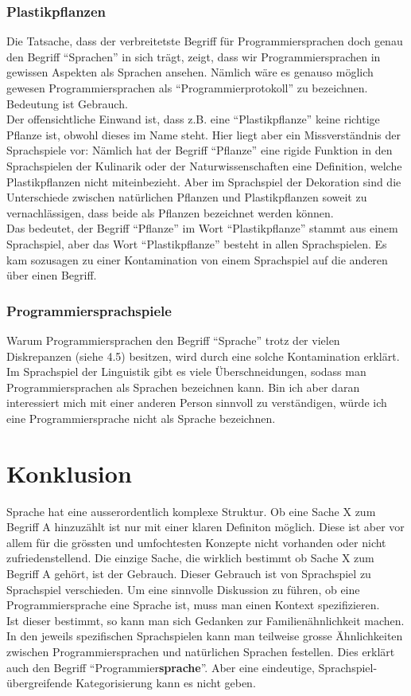 \documentclass[10pt,a4paper]{article}
\begin{document}
\subsubsection{Plastikpflanzen}
Die Tatsache, dass der verbreitetste Begriff für Programmiersprachen doch genau den Begriff \enquote{Sprachen} in sich trägt, zeigt, dass wir Programmiersprachen in gewissen Aspekten als Sprachen ansehen. Nämlich wäre es genauso möglich gewesen Programmiersprachen als \enquote{Programmierprotokoll} zu bezeichnen. Bedeutung ist Gebrauch. \\
Der offensichtliche Einwand ist, dass z.B. eine \enquote{Plastikpflanze} keine richtige Pflanze ist, obwohl dieses im Name steht. Hier liegt aber ein Missverständnis der Sprachspiele vor: Nämlich hat der Begriff \enquote{Pflanze} eine rigide Funktion in den Sprachspielen der Kulinarik oder der Naturwissenschaften eine Definition, welche Plastikpflanzen nicht miteinbezieht. Aber im Sprachspiel der Dekoration sind die Unterschiede zwischen natürlichen Pflanzen und Plastikpflanzen soweit zu vernachlässigen, dass beide als Pflanzen bezeichnet werden können. \\
Das bedeutet, der Begriff \enquote{Pflanze} im Wort \enquote{Plastikpflanze} stammt aus einem Sprachspiel, aber das Wort \enquote{Plastikpflanze} besteht in allen Sprachspielen. Es kam sozusagen zu einer Kontamination von einem Sprachspiel auf die anderen über einen Begriff.

\subsubsection{Programmiersprachspiele}
Warum Programmiersprachen den Begriff \enquote{Sprache} trotz der vielen Diskrepanzen (siehe 4.5) besitzen, wird durch eine solche Kontamination erklärt. Im Sprachspiel der Linguistik gibt es viele Überschneidungen, sodass man Programmiersprachen als Sprachen bezeichnen kann. Bin ich aber daran interessiert mich mit einer anderen Person sinnvoll zu verständigen, würde ich eine Programmiersprache nicht als Sprache bezeichnen.


\section{Konklusion}
Sprache hat eine ausserordentlich komplexe Struktur. Ob eine Sache X zum Begriff A hinzuzählt ist nur mit einer klaren Definiton möglich. Diese ist aber vor allem für die grössten und umfochtesten Konzepte nicht vorhanden oder nicht zufriedenstellend.
Die einzige Sache, die wirklich bestimmt ob Sache X zum Begriff A gehört, ist der Gebrauch.
Dieser Gebrauch ist von Sprachspiel zu Sprachspiel verschieden.
Um eine sinnvolle Diskussion zu führen, ob eine Programmiersprache eine Sprache ist, muss man einen Kontext spezifizieren. \\
Ist dieser bestimmt, so kann man sich Gedanken zur Familienähnlichkeit machen.
In den jeweils spezifischen Sprachspielen kann man teilweise grosse Ähnlichkeiten zwischen Programmiersprachen und natürlichen Sprachen festellen. Dies erklärt auch den Begriff \enquote{Programmier\textbf{sprache}}. Aber eine eindeutige, Sprachspiel-übergreifende Kategorisierung kann es nicht geben.
\end{document}
